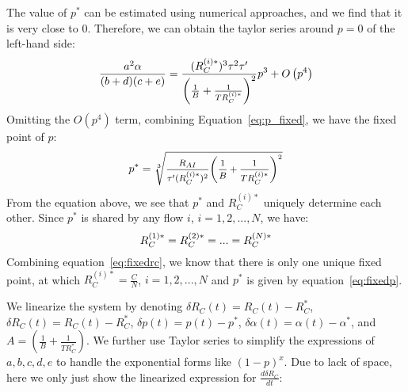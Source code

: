 The value of $p^*$ can be estimated using numerical approaches, and we find that
it is very close to 0. Therefore, we can obtain the taylor series around $p=0$
of the left-hand side:
\begin{equation}
\small
\frac{{{a^2}\alpha }}{{(b + d)(c + e)}} = \frac{{(R_C^{(i)*})^3{\tau ^2}\tau '}}{{{{\left( {\frac{1}{B} + \frac{1}{{TR_C^{(i)*}}}} \right)}^2}}}{p^3} + O\left( {{p^4}} \right)
\end{equation}
Omitting the $O(p^4)$ term, combining Equation~\ref{eq:p_fixed}, we have the fixed point of $p$:
\begin{equation}
\small
{p^*} = \sqrt[3]{{\frac{{{R_{AI}}}}{{{\tau '}(R_C^{(i)*})^2}}{{\left( {\frac{1}{B} + \frac{1}{TR_C^{(i)*}}} \right)}^2}}}
\label{eq:fixedp}
\end{equation}
From the equation above, we see that $p^*$ and $R_C^{(i)*}$ uniquely determine each other. 
Since $p^*$ is shared by any flow $i$, $i = 1, 2, ..., N$, we have:
\begin{equation}
\small
R_C^{(1)*} = R_C^{(2)*} = ... = R_C^{(N)*}
\end{equation}
Combining equation~\ref{eq:fixedrc}, we know that there is only one unique fixed
point, at which $R_C^{(i)*} = \frac{C}{N}$, $i = 1, 2, ..., N$ and $p^*$ is
given by equation~\ref{eq:fixedp}.


We linearize the system by denoting $\delta {R_C}(t) = {R_C}(t) - R_C^*$,
$\delta {R_C}(t) = {R_C}(t) - R_C^*$, $\delta p(t) = p(t) - p^*$, $\delta \alpha
(t) = \alpha (t) - \alpha^*$, and $A = \left( {\frac{1}{B} + \frac{1}{{TR_C^*}}}
\right)$.  We further use Taylor series to simplify the expressions of $a, b, c,
d, e$ to handle the exponential forms like $(1-p)^x$.  Due to lack of space,
here we only just show the linearized expression for $\frac{{d\delta {R_C}}}{{dt}}$:

